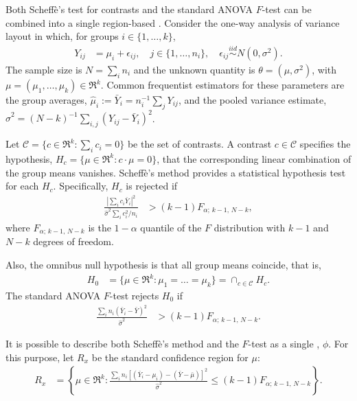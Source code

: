 \begin{example}
\label{sec:scheffe}
Both Scheff\`{e}'s test for contrasts \citep{Scheffe1953} and the standard ANOVA $F$-test can be combined into a single region-based \summ. Consider the one-way analysis of variance layout in which, for groups $i \in \{1,\dots,k\}$,
\begin{align*}
 Y_{ij} &= \mu_i + \epsilon_{ij},
 \quad j \in \{1, \dots, n_i\},
 \quad \epsilon_{ij}
 \overset{iid}{\sim} N(0,\sigma^2).
\end{align*}
The sample size is $N = \sum_{i} n_i$ and the unknown quantity is $\theta = (\mu,\sigma^2)$, with $\mu = (\mu_1,\dots,\mu_k) \in \Re^k$.
Common frequentist estimators for these parameters are the group averages, $\hat{\mu}_i := \bar{Y}_i = n_i^{-1}\sum_{j} Y_{ij}$, and the pooled variance estimate, $\hat{\sigma}^2 = (N-k)^{-1} \sum_{i,j}(Y_{ij} - \bar{Y}_i)^2$.

Let $\mathcal{C} = \{c \in \Re^k: \sum_{i} c_i = 0\}$ be the set of contrasts. A contrast $c \in \mathcal{C}$ specifies the hypothesis, $H_c = \{\mu \in \Re^k: c \cdot \mu = 0\}$, that the corresponding linear combination of the group means vanishes. Scheff\`{e}'s method provides a statistical hypothesis test for each $H_c$. Specifically, $H_c$ is rejected if
\begin{align*}
 \frac{\left|\sum_{i} c_i \bar{Y}_i\right|^2}{\hat{\sigma}^2 \sum_{i} c_i^2/n_i}
 &> (k-1) F_{\alpha; \, k-1, \, N-k},
\end{align*} 
where $F_{\alpha;\,k-1,\,N-k}$ is the $1-\alpha$ quantile of the $F$ distribution with $k-1$ and $N-k$ degrees of freedom. 

Also, the omnibus null hypothesis is that all group means coincide, that is,
\begin{align*}
 H_0 &= \{\mu \in \Re^k: \mu_1 = \dots = \mu_k\}
     = \cap_{c \in \mathcal{C}} H_c.
\end{align*}
The standard ANOVA $F$-test rejects $H_0$ if
\begin{align*}
 \frac{\sum_i n_i
(\bar{Y}_i - \bar{Y})^2}{\hat{\sigma}^2} &> (k-1) F_{\alpha; \, k-1, \, N-k}.
\end{align*}

It is possible to describe both Scheff\`{e}'s method and the $F$-test as a single \summ, $\phi$. For this purpose, let $R_x$ be the standard confidence region for $\mu$:
\begin{align*}
 R_x &= \left\{\mu \in \Re^k: \frac{\sum_{i} n_i \left[(\bar{Y}_i - \mu_i) - (\bar{Y} - \bar{\mu})\right]^2}{\hat{\sigma}^2}
 \leq (k-1) F_{\alpha; \, k-1, \, N-k}\right\}.
\end{align*}


\end{example}
